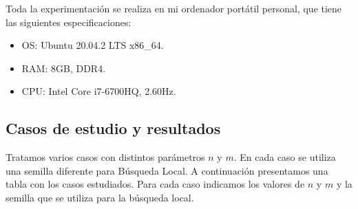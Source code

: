 \documentclass{article}
\begin{document}
Toda la experimentación se realiza en mi ordenador portátil personal, que tiene las siguientes especificaciones:
\begin{itemize}
	\item OS: Ubuntu 20.04.2 LTS x86\_64.
	\item RAM: 8GB, DDR4.
	\item CPU: Intel Core i7-6700HQ, 2.60Hz.
\end{itemize}

\subsection{Casos de estudio y resultados}

Tratamos varios casos con distintos parámetros $n$ y $m$. En cada caso se utiliza una semilla diferente para Búsqueda Local.
A continuación presentamos una tabla con los casos estudiados. Para cada caso indicamos los valores de $n$ y $m$ y la semilla
que se utiliza para la búsqueda local.
\end{document}
